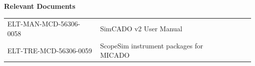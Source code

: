 \documentclass[a4paper,twoside,11pt]{article}
\begin{document}


\setcounter{tocdepth}{3}
\tableofcontents
\clearpage


\begin{center}
  \textbf{Relevant Documents}

  \tabletail{\hline}

  \begin{supertabular}{|l|l|l|l|}
   ELT-MAN-MCD-56306-0058 & SimCADO v2 User Manual \\
   ELT-TRE-MCD-56306-0059 & ScopeSim instrument packages for MICADO \\
   \hline
  \end{supertabular}

\end{center}








\end{document}
